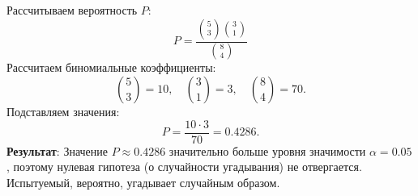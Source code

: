 Рассчитываем вероятность $P$:
\[
P = \frac{\binom{5}{3} \binom{3}{1}}{\binom{8}{4}}
\]
Рассчитаем биномиальные коэффициенты:
\[
\binom{5}{3} = 10, \quad \binom{3}{1} = 3, \quad \binom{8}{4} = 70.
\]
Подставляем значения:
\[
P = \frac{10 \cdot 3}{70} = 0.4286.
\]
\textbf{Результат}: Значение $P \approx 0.4286$ значительно больше уровня значимости $\alpha = 0.05$, поэтому нулевая гипотеза (о случайности угадывания) не отвергается. Испытуемый, вероятно, угадывает случайным образом.


